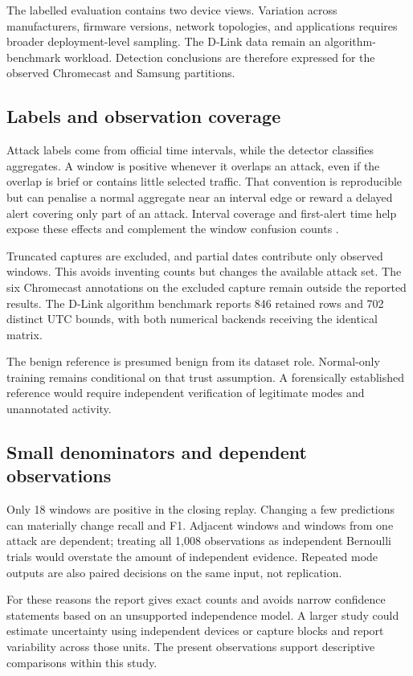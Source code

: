 The labelled evaluation contains two device views. Variation across
manufacturers, firmware versions, network topologies, and applications
requires broader deployment-level sampling. The D-Link data remain an
algorithm-benchmark workload. Detection conclusions are therefore expressed
for the observed Chromecast and Samsung partitions.

\subsection{Labels and observation coverage}

Attack labels come from official time intervals, while the detector
classifies aggregates. A window is positive whenever it overlaps an
attack, even if the overlap is brief or contains little selected
traffic. That convention is reproducible but can penalise a normal
aggregate near an interval edge or reward a delayed alert covering
only part of an attack. Interval coverage and first-alert time help
expose these effects and complement the window confusion counts
\cite{tatbul2018}.

Truncated captures are excluded, and partial dates contribute only
observed windows. This avoids inventing counts but changes the
available attack set. The six Chromecast annotations on the excluded capture
remain outside the reported results. The D-Link algorithm benchmark reports
846 retained rows and 702 distinct UTC bounds, with both numerical backends
receiving the identical matrix.

The benign reference is presumed benign from its dataset role.
Normal-only training remains conditional on that trust assumption. A
forensically established reference would require independent verification
of legitimate modes and unannotated activity.

\subsection{Small denominators and dependent observations}

Only 18 windows are positive in the closing replay. Changing a few
predictions can materially change recall and F1. Adjacent windows
and windows from one attack are dependent; treating all 1,008
observations as independent Bernoulli trials would overstate the
amount of independent evidence. Repeated mode outputs are also
paired decisions on the same input, not replication.

For these reasons the report gives exact counts and avoids narrow
confidence statements based on an unsupported independence model.
A larger study could estimate uncertainty using independent devices
or capture blocks and report variability across those units. The
present observations support descriptive comparisons within this study.

